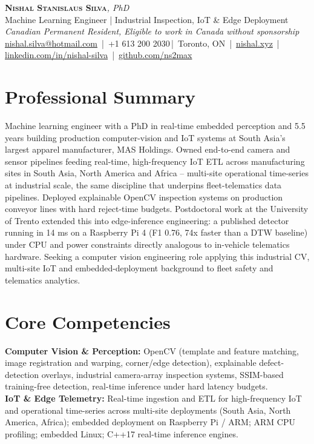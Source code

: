 \documentclass[11pt]{article}
\makeatletter
\newcommand{\cvName}{Nishal Stanislaus Silva}
\newcommand{\cvEmail}{nishal.silva@hotmail.com}
\newcommand{\cvPhone}{+1 613 200 2030}
\newcommand{\cvCity}{Toronto, ON}
\newcommand{\cvSite}{https://nishal.xyz}
\newcommand{\cvLinkedIn}{https://www.linkedin.com/in/nishal-silva}
\newcommand{\cvGitHub}{https://github.com/ns2max}
\newcommand{\cvStatus}{Canadian Permanent Resident, Eligible to work in Canada without sponsorship}
\newcommand{\cvTagline}{Machine Learning Engineer | Industrial Inspection, IoT \& Edge Deployment}
\makeatother
\begin{document}
\pagestyle{empty}
\begin{center}
    {\LARGE \scshape \textbf{\cvName}}{\large \textit{, PhD}}\\[1pt]
    {\small \cvTagline}\\[1pt]
    {\footnotesize\textit{\cvStatus}}\\[1pt]
    {\small
    \href{mailto:\cvEmail}{\cvEmail} \,|\, \cvPhone \,|\, \cvCity
    \,|\, \href{\cvSite}{nishal.xyz} \,|\, \href{\cvLinkedIn}{linkedin.com/in/nishal-silva}
    \,|\, \href{\cvGitHub}{github.com/ns2max}}
\end{center}

\section*{Professional Summary}
Machine learning engineer with a PhD in real-time embedded perception and 5.5 years building production computer-vision and IoT systems at South Asia's largest apparel manufacturer, MAS Holdings. Owned end-to-end camera and sensor pipelines feeding real-time, high-frequency IoT ETL across manufacturing sites in South Asia, North America and Africa -- multi-site operational time-series at industrial scale, the same discipline that underpins fleet-telematics data pipelines. Deployed explainable OpenCV inspection systems on production conveyor lines with hard reject-time budgets. Postdoctoral work at the University of Trento extended this into edge-inference engineering: a published detector running in 14 ms on a Raspberry Pi 4 (F1 0.76, 74x faster than a DTW baseline) under CPU and power constraints directly analogous to in-vehicle telematics hardware. Seeking a computer vision engineering role applying this industrial CV, multi-site IoT and embedded-deployment background to fleet safety and telematics analytics.

\section*{Core Competencies}
\textbf{Computer Vision \& Perception:} OpenCV (template and feature matching, image registration and warping, corner/edge detection), explainable defect-detection overlays, industrial camera-array inspection systems, SSIM-based training-free detection, real-time inference under hard latency budgets. \\
\textbf{IoT \& Edge Telemetry:} Real-time ingestion and ETL for high-frequency IoT and operational time-series across multi-site deployments (South Asia, North America, Africa); embedded deployment on Raspberry Pi / ARM; ARM CPU profiling; embedded Linux; C++17 real-time inference engines.
\end{document}
